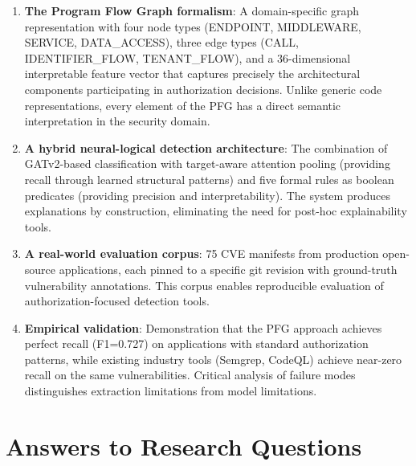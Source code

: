 \begin{enumerate}
    \item \textbf{The Program Flow Graph formalism}: A domain-specific graph representation with four node types (ENDPOINT, MIDDLEWARE, SERVICE, DATA\_ACCESS), three edge types (CALL, IDENTIFIER\_FLOW, TENANT\_FLOW), and a 36-dimensional interpretable feature vector that captures precisely the architectural components participating in authorization decisions. Unlike generic code representations, every element of the PFG has a direct semantic interpretation in the security domain.

    \item \textbf{A hybrid neural-logical detection architecture}: The combination of GATv2-based classification with target-aware attention pooling (providing recall through learned structural patterns) and five formal rules as boolean predicates (providing precision and interpretability). The system produces explanations by construction, eliminating the need for post-hoc explainability tools.

    \item \textbf{A real-world evaluation corpus}: 75 CVE manifests from production open-source applications, each pinned to a specific git revision with ground-truth vulnerability annotations. This corpus enables reproducible evaluation of authorization-focused detection tools.

    \item \textbf{Empirical validation}: Demonstration that the PFG approach achieves perfect recall (F1=0.727) on applications with standard authorization patterns, while existing industry tools (Semgrep, CodeQL) achieve near-zero recall on the same vulnerabilities. Critical analysis of failure modes distinguishes extraction limitations from model limitations.
\end{enumerate}

\section*{Answers to Research Questions}

